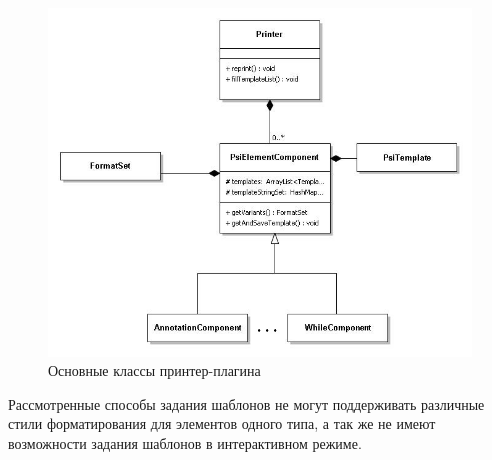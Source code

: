 \begin{figure}[h!]
	\centering
	\includegraphics[width=\textwidth]{images/hierarchyPP}
	\caption{Основные классы принтер-плагина}
	\label{fig:hierarchyPP}
\end{figure}

Рассмотренные способы задания шаблонов не могут поддерживать различные стили форматирования для элементов одного типа, а так же не имеют возможности задания шаблонов в интерактивном режиме. 

